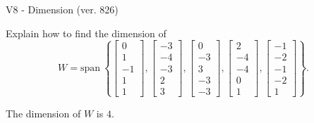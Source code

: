 \begin{exercise}
  \begin{exerciseTitle}V8 - Dimension (ver. 826)\end{exerciseTitle}
  \begin{exerciseStatement}
    Explain how to find the dimension of 
\[W=\mathrm{span}\ \left\{\left[\begin{array}{r}
0 \\
1 \\
-1 \\
1 \\
1
\end{array}\right] , \left[\begin{array}{r}
-3 \\
-4 \\
-3 \\
2 \\
3
\end{array}\right] , \left[\begin{array}{r}
0 \\
-3 \\
3 \\
-3 \\
-3
\end{array}\right] , \left[\begin{array}{r}
2 \\
-4 \\
-4 \\
0 \\
1
\end{array}\right] , \left[\begin{array}{r}
-1 \\
-2 \\
-1 \\
-2 \\
1
\end{array}\right]\right\}.\]



  \end{exerciseStatement}
  \begin{exerciseAnswer}
   The dimension of \(W\) is  \(4\).
  


  \end{exerciseAnswer}
\end{exercise}